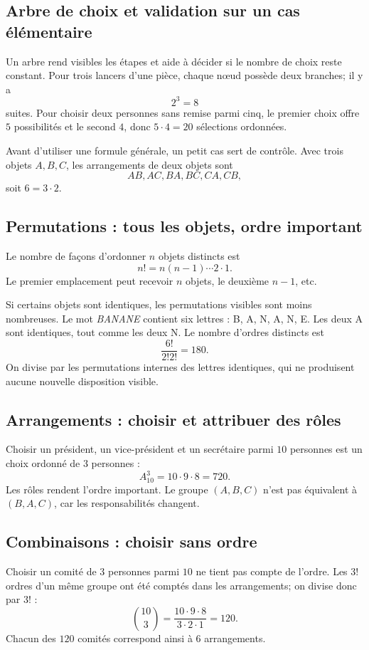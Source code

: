 \subsection{Arbre de choix et validation sur un cas élémentaire}

Un arbre rend visibles les étapes et aide à décider si le nombre de choix reste constant. Pour trois lancers d'une pièce, chaque nœud possède deux branches; il y a
\[
2^3=8
\]
suites. Pour choisir deux personnes sans remise parmi cinq, le premier choix offre $5$ possibilités et le second $4$, donc $5\cdot4=20$ sélections ordonnées.

Avant d'utiliser une formule générale, un petit cas sert de contrôle. Avec trois objets $A,B,C$, les arrangements de deux objets sont
\[
AB,AC,BA,BC,CA,CB,
\]
soit $6=3\cdot2$.

\subsection{Permutations : tous les objets, ordre important}

Le nombre de façons d'ordonner $n$ objets distincts est
\[
n!=n(n-1)\cdots2\cdot1.
\]
Le premier emplacement peut recevoir $n$ objets, le deuxième $n-1$, etc.

Si certains objets sont identiques, les permutations visibles sont moins nombreuses. Le mot \emph{BANANE} contient six lettres : B, A, N, A, N, E. Les deux A sont identiques, tout comme les deux N. Le nombre d'ordres distincts est
\[
\frac{6!}{2!2!}=180.
\]
On divise par les permutations internes des lettres identiques, qui ne produisent aucune nouvelle disposition visible.

\subsection{Arrangements : choisir et attribuer des rôles}

Choisir un président, un vice-président et un secrétaire parmi $10$ personnes est un choix ordonné de $3$ personnes :
\[
A_{10}^3=10\cdot9\cdot8=720.
\]
Les rôles rendent l'ordre important. Le groupe $(A,B,C)$ n'est pas équivalent à $(B,A,C)$, car les responsabilités changent.

\subsection{Combinaisons : choisir sans ordre}

Choisir un comité de $3$ personnes parmi $10$ ne tient pas compte de l'ordre. Les $3!$ ordres d'un même groupe ont été comptés dans les arrangements; on divise donc par $3!$ :
\[
\binom{10}{3}=\frac{10\cdot9\cdot8}{3\cdot2\cdot1}=120.
\]
Chacun des $120$ comités correspond ainsi à $6$ arrangements.

